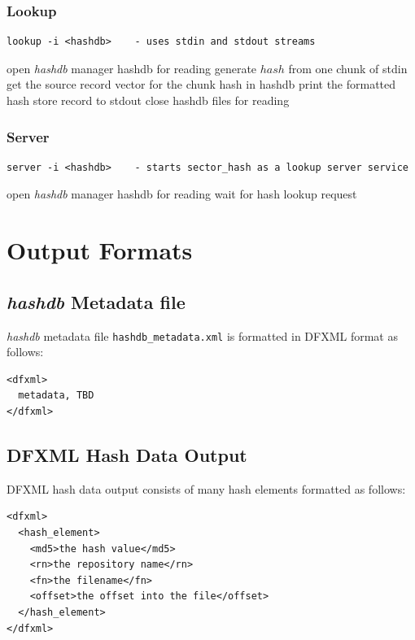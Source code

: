 \documentclass[12pt,twoside]{article}
\newcommand{\hdb}{\emph{hashdb}\xspace}
\begin{document}
\subsubsection{Lookup}
\begin{small}
\begin{verbatim}
lookup -i <hashdb>    - uses stdin and stdout streams
\end{verbatim}
\end{small}
\begin{algorithmic}
\STATE open \hdb manager hashdb for reading
  \STATE generate $hash$ from one chunk of stdin
    \STATE get the source record vector for the chunk hash in hashdb
      \STATE print the formatted hash store record to stdout
    \ENDFOR
  \ENDIF
\ENDWHILE
\STATE close hashdb files for reading
\end{algorithmic}

\subsubsection{Server}
\begin{small}
\begin{verbatim}
server -i <hashdb>    - starts sector_hash as a lookup server service
\end{verbatim}
\end{small}
\begin{algorithmic}
\STATE open \hdb manager hashdb for reading
\WHILE{\TRUE}
  \STATE wait for hash lookup request
    \RETURN \TRUE
  \ELSE
    \RETURN \FALSE
  \ENDIF
\ENDWHILE
\end{algorithmic}

\section{Output Formats}
\subsection{\hdb Metadata file}
\hdb metadata file \texttt{hashdb\_metadata.xml}
is formatted in DFXML format as follows:
\begin{small}
\begin{verbatim}
<dfxml>
  metadata, TBD
</dfxml>
\end{verbatim}
\end{small}

\subsection{DFXML Hash Data Output}
DFXML hash data output consists of many hash elements formatted as follows:
\begin{small}
\begin{verbatim}
<dfxml>
  <hash_element>
    <md5>the hash value</md5>
    <rn>the repository name</rn>
    <fn>the filename</fn>
    <offset>the offset into the file</offset>
  </hash_element>
</dfxml>
\end{verbatim}
\end{small}
\end{document}
